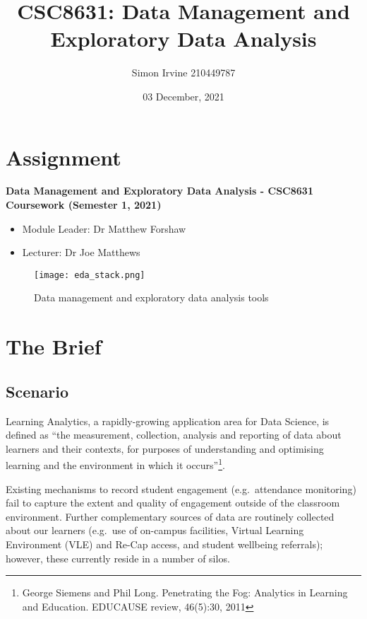 \documentclass[
]{article}
\title{CSC8631: Data Management and Exploratory Data Analysis}
\author{Simon Irvine \textbar{} 210449787}
\date{03 December, 2021}
\begin{document}
\maketitle

\hypertarget{assignment}{%
\section{Assignment}\label{assignment}}

\textbf{Data Management and Exploratory Data Analysis - CSC8631
Coursework (Semester 1, 2021)}

\begin{itemize}
\item
  Module Leader: Dr Matthew Forshaw
\item
  Lecturer: Dr Joe Matthews
\end{itemize}

\begin{figure}
\centering
\texttt{[image: eda\_stack.png]}
\caption{Data management and exploratory data analysis tools}
\end{figure}

\hypertarget{the-brief}{%
\section{The Brief}\label{the-brief}}

\hypertarget{scenario}{%
\subsection{Scenario}\label{scenario}}

Learning Analytics, a rapidly-growing application area for Data Science,
is defined as ``the measurement, collection, analysis and reporting of
data about learners and their contexts, for purposes of understanding
and optimising learning and the environment in which it
occurs''\footnote{George Siemens and Phil Long. Penetrating the Fog:
  Analytics in Learning and Education. EDUCAUSE review, 46(5):30, 2011}.

Existing mechanisms to record student engagement (e.g.~attendance
monitoring) fail to capture the extent and quality of engagement outside
of the classroom environment. Further complementary sources of data are
routinely collected about our learners (e.g.~use of on-campus
facilities, Virtual Learning Environment (VLE) and Re-Cap access, and
student wellbeing referrals); however, these currently reside in a
number of silos.
\end{document}
